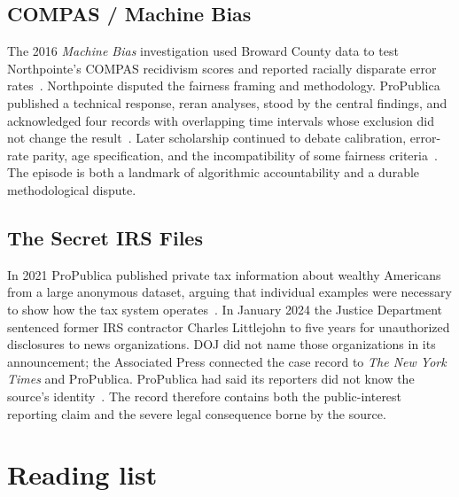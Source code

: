 \documentclass[10pt,letterpaper,twocolumn]{article}
\begin{document}
\subsection{COMPAS / Machine Bias}

The 2016 \emph{Machine Bias} investigation used Broward County data to test Northpointe's COMPAS recidivism scores and reported racially disparate error rates~\citep{ppmachinebias}. Northpointe disputed the fairness framing and methodology. ProPublica published a technical response, reran analyses, stood by the central findings, and acknowledged four records with overlapping time intervals whose exclusion did not change the result~\citep{ppcompasresponse}. Later scholarship continued to debate calibration, error-rate parity, age specification, and the incompatibility of some fairness criteria~\citep{rudin2019}. The episode is both a landmark of algorithmic accountability and a durable methodological dispute.

\subsection{The Secret IRS Files}

In 2021 ProPublica published private tax information about wealthy Americans from a large anonymous dataset, arguing that individual examples were necessary to show how the tax system operates~\citep{ppirs}. In January 2024 the Justice Department sentenced former IRS contractor Charles Littlejohn to five years for unauthorized disclosures to news organizations. DOJ did not name those organizations in its announcement; the Associated Press connected the case record to \emph{The New York Times} and ProPublica. ProPublica had said its reporters did not know the source's identity~\citep{dojlittlejohn,aplittlejohn}. The record therefore contains both the public-interest reporting claim and the severe legal consequence borne by the source.

\section{Reading list}
\end{document}
